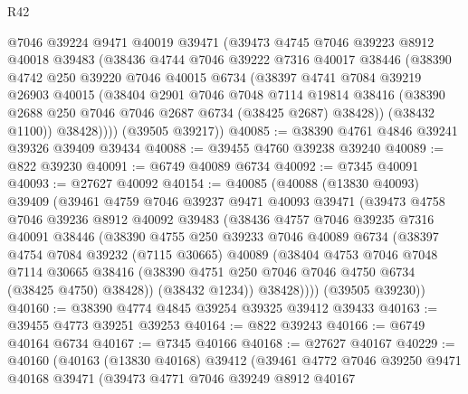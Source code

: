 \begin{lexlean}{R42}
\begin{coremodule}
{        @7046
        @39224
        @9471
        @40019
        @39471
        (@39473
          @4745
          @7046
          @39223
          @8912
          @40018
          @39483
          (@38436
            @4744
            @7046
            @39222
            @7316
            @40017
            @38446
            (@38390
              @4742
              @250
              @39220
              @7046
              @40015
              @6734
              (@38397
                @4741
                @7084
                @39219
                @26903
                @40015
                (@38404
                  @2901
                  @7046
                  @7048
                  @7114
                  @19814
                  @38416
                  (@38390 @2688 @250 @7046 @7046 @2687 @6734 (@38425 @2687) @38428))
                (@38432 @1100))
              @38428))))
      (@39505 @39217))
@40085 := @38390 @4761 @4846 @39241 @39326 @39409 @39434
@40088 := @39455 @4760 @39238 @39240
@40089 := @822 @39230
@40091 := @6749 @40089 @6734
@40092 := @7345 @40091
@40093 := @27627 @40092
@40154 := @40085
    (@40088
      (@13830 @40093)
      @39409
      (@39461
        @4759
        @7046
        @39237
        @9471
        @40093
        @39471
        (@39473
          @4758
          @7046
          @39236
          @8912
          @40092
          @39483
          (@38436
            @4757
            @7046
            @39235
            @7316
            @40091
            @38446
            (@38390
              @4755
              @250
              @39233
              @7046
              @40089
              @6734
              (@38397
                @4754
                @7084
                @39232
                (@7115 @30665)
                @40089
                (@38404
                  @4753
                  @7046
                  @7048
                  @7114
                  @30665
                  @38416
                  (@38390 @4751 @250 @7046 @7046 @4750 @6734 (@38425 @4750) @38428))
                (@38432 @1234))
              @38428))))
      (@39505 @39230))
@40160 := @38390 @4774 @4845 @39254 @39325 @39412 @39433
@40163 := @39455 @4773 @39251 @39253
@40164 := @822 @39243
@40166 := @6749 @40164 @6734
@40167 := @7345 @40166
@40168 := @27627 @40167
@40229 := @40160
    (@40163
      (@13830 @40168)
      @39412
      (@39461
        @4772
        @7046
        @39250
        @9471
        @40168
        @39471
        (@39473
          @4771
          @7046
          @39249
          @8912
          @40167
}
\end{coremodule}
\end{lexlean}
